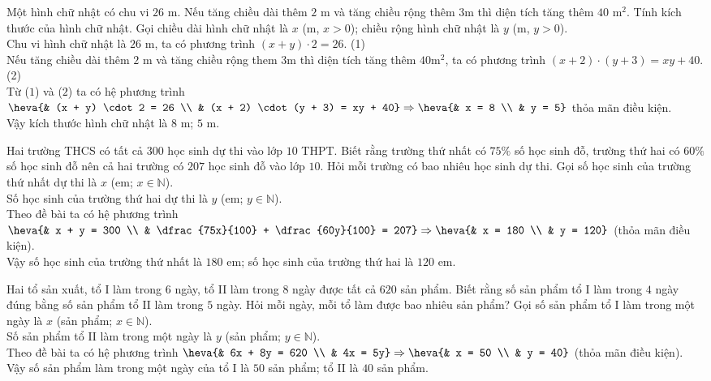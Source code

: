 \begin{bt}%
	Một hình chữ nhật có chu vi $26$ m. Nếu tăng chiều dài thêm $2$ m và tăng chiều rộng thêm $3$m thì diện tích tăng thêm $40$ m$^2$. Tính kích thước của hình chữ nhật.
	\loigiai
	{
	Gọi chiều dài hình chữ nhật là $x$ (m, $x > 0$); chiều rộng hình chữ nhật là $y$ (m, $y > 0$).\\
	Chu vi hình chữ nhật là $26$ m, ta có phương trình $(x + y) \cdot 2 = 26$. \hfill(1)\\
	Nếu tăng chiều dài thêm $2$ m và tăng chiều rộng them $3$m thì diện tích tăng thêm $40 \mbox{m}^2$, ta có phương trình $(x + 2)\cdot (y + 3) = xy + 40$. \hfill(2)\\
	Từ ($1$) và ($2$) ta có hệ phương trình $\heva{& (x + y) \cdot 2 = 26 \\ & (x + 2) \cdot (y + 3) = xy + 40} \Rightarrow \heva{& x = 8 \\ & y = 5}$ thỏa mãn điều kiện.\\
	Vậy kích thước hình chữ nhật là $8$ m; $5$ m.
	}
\end{bt}
\begin{bt}%
	Hai trường THCS có tất cả $300$ học sinh dự thi vào lớp $10$ THPT. Biết rằng trường thứ nhất có $75\%$ số học sinh đỗ, trường thứ hai có $60\%$ số học sinh đỗ nên cả hai trường có $207$ học sinh đỗ vào lớp $10$. Hỏi mỗi trường có bao nhiêu học sinh dự thi.	
	\loigiai
	{
	Gọi số học sinh của trường thứ nhất dự thi là $x$ (em; $x \in \mathbb{N}$).\\
	Số học sinh của trường thứ hai dự thi là $y$ (em; $y \in \mathbb{N}$).\\
	Theo đề bài ta có hệ phương trình $\heva{& x + y = 300 \\ & \dfrac{75x}{100} + \dfrac{60y}{100} = 207} \Rightarrow \heva{& x = 180 \\ & y = 120}$ (thỏa mãn điều kiện).\\
	Vậy số học sinh của trường thứ nhất là $180$ em; số học sinh của trường thứ hai là $120$ em.
	}
\end{bt}
\begin{bt}%
	Hai tổ sản xuất, tổ I làm trong $6$ ngày, tổ II làm trong $8$ ngày được tất cả $620$ sản phẩm. Biết rằng số sản phẩm tổ I làm trong $4$ ngày đúng bằng số sản phẩm tổ II làm trong $5$ ngày. Hỏi mỗi ngày, mỗi tổ làm được bao nhiêu sản phẩm?	
	\loigiai
	{
	Gọi số sản phẩm tổ I làm trong một ngày là $x$ (sản phẩm; $x \in \mathbb{N}$).\\
	Số sản phẩm tổ II làm trong một ngày là $y$ (sản phẩm; $y \in \mathbb{N}$).\\
	Theo đề bài ta có hệ phương trình $\heva{& 6x + 8y = 620 \\ & 4x = 5y} \Rightarrow \heva{& x = 50 \\ & y = 40}$ (thỏa mãn điều kiện).\\
	Vậy số sản phẩm làm trong một ngày của tổ I là $50$ sản phẩm; tổ II là $40$ sản phẩm.
	}
\end{bt}
